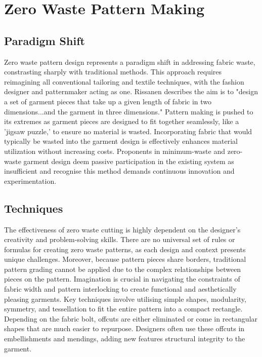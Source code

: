 \section{Zero Waste Pattern Making}
\subsection{Paradigm Shift}
Zero waste pattern design represents a paradigm shift in addressing fabric waste, constrasting sharply with traditional methods. This approach requires reimagining all conventional tailoring and textile techniques, with the fashion designer and patternmaker acting as one. Rissanen describes the aim is to "design a set of garment pieces that take up a given length of fabric in two dimensions...and the garment in three dimensions." Pattern making is pushed to its extremes as garment pieces are designed to fit together seamlessly, like a 'jigsaw puzzle,' to ensure no material is wasted. Incorporating fabric that would typically be wasted into the garment design is effectively enhances material utilization without increasing costs. Proponents in minimum-waste and zero-waste garment design deem passive participation in the existing system as insufficient and recognise this method demands continuous innovation and experimentation.

\subsection{Techniques}
The effectiveness of zero waste cutting is highly dependent on the designer's creativity and problem-solving skills. There are no universal set of rules or formulas for creating zero waste patterns, as each design and context presents unique challenges. Moreover, because pattern pieces share borders, traditional pattern grading cannot be applied due to the complex relationships between pieces on the pattern. Imagination is crucial in navigating the constraints of fabric width and pattern interlocking to create functional and aesthetically pleasing garments. Key techniques involve utilising simple shapes, modularity, symmetry, and tessellation to fit the entire pattern into a compact rectangle. Depending on the fabric bolt, offcuts are either eliminated or come in rectangular shapes that are much easier to repurpose. Designers often use these offcuts in embellishments and mendings, adding new features structural integrity to the garment.

